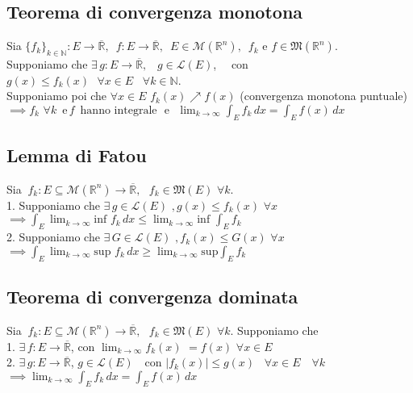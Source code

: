 \documentclass{article} %
\begin{document}
    \subsection*{Teorema di convergenza monotona}
    Sia $ \{ f_k \}_{k\in\mathbb{N}}: E \to \overline{\mathbb{R}}, \,\,\, f: E \to \overline{\mathbb{R}}, \,\,\, E \in \mathcal{M} (\mathbb{R} ^n) , \,\,\, f_k \text{ e } f \in \mathfrak{M}(\mathbb{R} ^n) $. \\ Supponiamo che $\exists \, g: E \to \overline{\mathbb{R}}, \,\,\,\,\, g \in \mathcal{L} (E) $, \,\,\,\, con $g(x)\leq f_k(x) \, \,\,\, \forall x \in E \, \,\,\,\, \forall k \in \mathbb{N} $. \\ Supponiamo poi che $\forall x \in E$ $f_k(x)\nearrow f(x)$ (convergenza monotona puntuale) \\
    $ \implies f_k \, \, \forall k \,\,\, \text{e} \, f \,\,\, \text{hanno integrale} \,\,\,\, \text{e} \,\,\,\, \lim_{k \to \infty} \int_{E}^{}f_k \,dx = \int_{E}^{}f(x) \,dx $

    \subsection*{Lemma di Fatou}
    Sia $ \ f_k: E \subseteq \mathcal{M} (\mathbb{R} ^n) \to \overline{\mathbb{R}} , \,\,\,\, f_k \in \mathfrak{M} (E) \,\, \forall k$. \\ 1. Supponiamo che $\exists \, g \in \mathcal{L} (E) \,\, , g(x) \leq f_k(x) \,\, \forall x $
    $ \implies \int_{E}^{}   \lim_{k \to \infty} \text{inf }f_k \,dx  \leq  \lim_{k \to \infty} \text{inf }\int_{E}^{}f_k$ \\
    2. Supponiamo che $\exists \, G \in \mathcal{L} (E) \,\, , f_k(x) \leq G(x) \,\, \forall x $
    $ \implies \int_{E}^{}   \lim_{k \to \infty} \text{sup }f_k \,dx  \geq  \lim_{k \to \infty} \text{sup} \int_{E}^{}f_k$
  

    \subsection*{Teorema di convergenza dominata}
    Sia $ \ f_k: E \subseteq \mathcal{M} (\mathbb{R} ^n) \to \overline{\mathbb{R}} , \,\,\,\, f_k \in \mathfrak{M} (E) \,\, \forall k$. Supponiamo che \\ 1. $\exists \, f: E \to \overline{\mathbb{R}} $, con $\lim_{k \to \infty} f_k(x) $ $= f(x)$ $\forall x \in E$ \\ 2. $\exists \, g: E \to \overline{\mathbb{R}} $, $g \in \mathcal{L} (E)$ \,\, con $|f_k(x)| \leq g(x) \,\,\,\,\, \forall x \in E \,\,\,\,\,\, \forall k$
    $ \implies \lim_{k \to \infty} \int_{E}^{}f_k \,dx = \int_{E}^{}f(x) \,dx $
  
\end{document}
